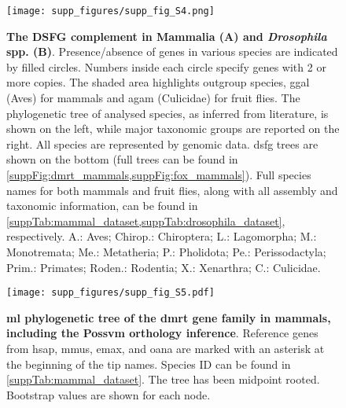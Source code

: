\begin{figure}[ht]
	\centering
	\texttt{[image: supp\_figures/supp\_fig\_S4.png]}
	\captionsetup[subfigure]{labelformat=nocaption}
	\begin{subfigure}{0\linewidth}
	\caption{}\label{suppFig:DSFG_testCompilation-A}
	\end{subfigure}%
	\begin{subfigure}{0\linewidth}
	\caption{}\label{suppFig:DSFG_testCompilation-B}
	\end{subfigure}%
	\caption[\textbf{The DSFG complement in Mammalia and \textit{Drosophila} spp.}]
	{
		\textbf{The DSFG complement in Mammalia (A) and \textit{Drosophila} spp. (B)}. Presence/absence of genes in various species are indicated by filled circles. Numbers inside each circle specify genes with 2 or more copies. The shaded area highlights outgroup species, \gls{ggal} (Aves) for mammals and \gls{agam} (Culicidae) for fruit flies. The phylogenetic tree of analysed species, as inferred from literature, is shown on the left, while major taxonomic groups are reported on the right. All species are represented by genomic data. \gls{dsfg} trees are shown on the bottom (full trees can be found in \cref{suppFig:dmrt_mammals,suppFig:fox_mammals}). Full species names for both mammals and fruit flies, along with all assembly and taxonomic information, can be found in \cref{suppTab:mammal_dataset,suppTab:drosophila_dataset}, respectively. A.: Aves; Chirop.: Chiroptera; L.: Lagomorpha; M.: Monotremata; Me.: Metatheria; P.: Pholidota; Pe.: Perissodactyla; Prim.: Primates; Roden.: Rodentia; X.: Xenarthra; C.: Culicidae.
	}
	\label{suppFig:DSFG_testCompilation}
\end{figure}

\begin{figure}[ht]
	\centering
	\texttt{[image: supp\_figures/supp\_fig\_S5.pdf]}
	\caption[\textbf{\gls{ml} phylogenetic tree of the \gls{dmrt} gene family in mammals, including the Possvm orthology inference}]
	{
		\textbf{\gls{ml} phylogenetic tree of the \gls{dmrt} gene family in mammals, including the Possvm orthology inference}. Reference genes from \gls{hsap}, \gls{mmus}, \gls{emax}, and \gls{oana} are marked with an asterisk at the beginning of the tip names. Species ID can be found in \cref{suppTab:mammal_dataset}. The tree has been midpoint rooted. Bootstrap values are shown for each node.
	}
	\label{suppFig:dmrt_mammals}
\end{figure}

